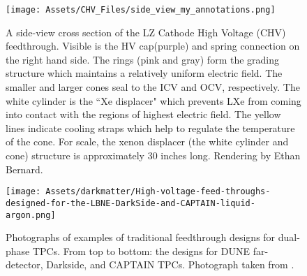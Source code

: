 \begin{figure}
    \centering
    \texttt{[image: Assets/CHV\_Files/side\_view\_my\_annotations.png]}
    \caption[A side-view cross section of the  LZ Cathode High Voltage (CHV) feedthrough. ]%
    {A side-view cross section of the  LZ Cathode High Voltage (CHV) feedthrough. 
    Visible is the HV cap(purple) and spring connection on the right hand side.
    The rings (pink and gray) form the grading structure which maintains a relatively uniform electric field.
    The smaller and larger cones seal to the ICV and OCV, respectively.
    The white cylinder is the ``Xe displacer" which prevents LXe from coming into contact with the regions of highest electric field.
    The yellow lines indicate cooling straps which help to regulate the temperature of the cone.
    For scale, the xenon displacer (the white cylinder and cone) structure is approximately 30 inches long.
    Rendering by Ethan Bernard.}
    \label{fig:grading_cone}
\end{figure}
\begin{figure}
    \centering
    \texttt{[image: Assets/darkmatter/High-voltage-feed-throughs-designed-for-the-LBNE-DarkSide-and-CAPTAIN-liquid-argon.png]}
    \caption[ Photographs of examples of traditional feedthrough designs for dual-phase TPCs.]%
    { 
    Photographs of examples of traditional feedthrough designs for dual-phase TPCs. 
    From top to bottom: the designs for DUNE far-detector, Darkside, and CAPTAIN TPCs.
    Photograph taken from \cite{rebel_high_2014}.
    }
    \label{fig:hwang_design}
\end{figure}



